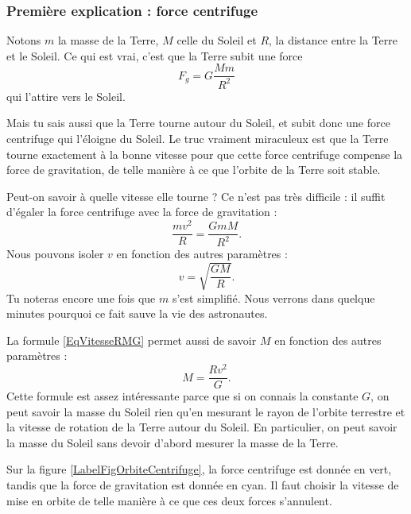 \documentclass[a4paper,12pt]{book}
\theoremstyle{mes_exemples}	\newtheorem{exemple}[numtho]{Exemple}
\theoremstyle{mes_tho}
\begin{document}
\subsubsection{Première explication : force centrifuge}

Notons $m$ la masse de la Terre, $M$ celle du Soleil et $R$, la distance entre la Terre et le Soleil. Ce qui est vrai, c'est que la Terre subit une force 
\begin{equation}
	F_g=G\frac{ Mm }{ R^2 }
\end{equation}
qui l'attire vers le Soleil.

Mais tu sais aussi que la Terre tourne autour du Soleil, et subit donc une force centrifuge qui l'éloigne du Soleil. Le truc vraiment miraculeux est que la Terre tourne exactement à la bonne vitesse pour que cette force centrifuge compense la force de gravitation, de telle manière à ce que l'orbite de la Terre soit stable.

Peut-on savoir à quelle vitesse elle tourne ? Ce n'est pas très difficile : il suffit d'égaler la force centrifuge avec la force de gravitation :
\begin{equation}
	\frac{ mv^2 }{ R }=\frac{ GmM }{ R^2 }.
\end{equation}
Nous pouvons isoler $v$ en fonction des autres paramètres :
\begin{equation}			\label{EqVitesseRMG}
	v=\sqrt{\frac{ GM }{ R }}.
\end{equation}
Tu noteras encore une fois que $m$ s'est simplifié. Nous verrons dans quelque minutes pourquoi ce fait sauve la vie des astronautes.

La formule \eqref{EqVitesseRMG} permet aussi de savoir $M$ en fonction des autres paramètres :
\begin{equation}
	M=\frac{ Rv^2 }{ G }.
\end{equation}
Cette formule est assez intéressante parce que si on connais la constante $G$, on peut savoir la masse du Soleil rien qu'en mesurant le rayon de l'orbite terrestre et la vitesse de rotation de la Terre autour du Soleil. En particulier, on peut savoir la masse du Soleil sans devoir d'abord mesurer la masse de la Terre.

Sur la figure \ref{LabelFigOrbiteCentrifuge}, la force centrifuge est donnée en vert, tandis que la force de gravitation est donnée en cyan. Il faut choisir la vitesse de mise en orbite de telle manière à ce que ces deux forces s'annulent.
\newcommand{\CaptionFigOrbiteCentrifuge}{L'art de la mise en orbite est de donner la vitesse exacte qu'il faut pour que la force de gravitation soit exactement compensée par la force centrifuge.}

\end{document}
